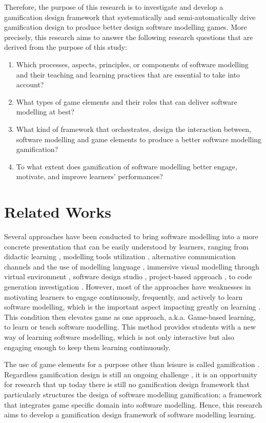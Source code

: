 \documentclass[runningheads,a4paper]{llncs}
\begin{document}
Therefore, the purpose of this research is to investigate and develop a gamification design framework that systematically and semi-automatically drive gamification design to produce better design software modelling games. More precisely, this research aims to answer the following research questions that are derived from the purpose of this study:
\begin{enumerate}
\item Which processes, aspects, principles, or components of software modelling and their teaching and learning practices that are essential to take into account?
\item What types of game elements and their roles that can deliver software modelling at best? 
\item What kind of framework that orchestrates, design the interaction between, software modelling and game elements to produce a better software modelling gamification?
\item To what extent does gamification of software modelling better engage, motivate, and improve learners’ performances?
\end{enumerate}

\section{Related Works}
Several approaches have been conducted to bring software modelling into a more concrete presentation that can be easily understood by learners, ranging from didactic learning \cite{moisan2009teaching}, modelling tools utilization \cite{Akayama2013}, alternative communication channels and the use of modelling language \cite{Brandsteidl2011}, immersive visual modelling through virtual environment \cite{neubauer2003immersive}, software design studio \cite{Whittle2014}, project-based approach \cite{Szmurlo2007}, to code generation investigation \cite{schmidt2014teaching}. However, most of the approaches have weaknesses in motivating learners to engage continuously, frequently, and actively to learn software modelling, which is the important aspect impacting greatly on learning \cite{Naps2005}. This condition then elevates game as one approach, a.k.a. Game-based learning, to learn or teach software modelling. This method provides students with a new way of learning software modelling, which is not only interactive but also engaging enough to keep them learning continuously. 

The use of game elements for a purpose other than leisure is called gamification \cite{deterding2011game}. Regardless gamification design is still an ongoing challenge \cite{Deterding2013}, it is an opportunity for research that up today there is still no gamification design framework that particularly structures the design of software modelling gamification; a framework that integrates game specific domain into software modelling. Hence, this research aims to develop a gamification design framework of software modelling learning.
\end{document}
